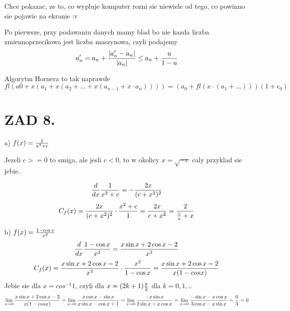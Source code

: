 \documentclass{article}[13pt]
\begin{document}
    Chce pokazac, ze to, co wypluje komputer rozni sie niewiele od tego, co powinno sie pojawic na ekranie :v
    \medskip

    Po pierwsze, przy podawaniu danych mamy blad bo nie kazda liczba zmiennoprzecikowa jest liczba maszynowa, czyli podajemy
    $$a_n'=a_n+{|a_n'-a_n|\over |a_n|}\leq a_n+{u\over 1-u}$$

    Algorytm Hornera to tak naprawde
    $$fl(a0+x(a_1+x(a_2+...+x(a_{n-1}+x\cdot a_n))))=(a_0+fl(x\cdot(a_1+...)))(1+\epsilon_0)$$

    \section*{ZAD 8.}
    a) $f(x)={1\over x^2+c}$

    Jezeli $c>=0$ to smiga, ale jesli $c<0$, to w okolicy $x=\sqrt{-c}$ caly przyklad sie jebie.

    $${d\over dx}{1\over x^2+c}=-{2x\over (c+x^2)^2}$$
    $$C_f(x)={2x\over (c+x^2)^2}\cdot{x^2+c\over 1}={2x\over c+x^2}={2\over \frac{c}{x}+x}$$
    \medskip

    b) $f(x)={1-\cos x\over x^2}$
    $${d\over dx}{1-\cos x\over x^2}={x\sin x+2\cos x-2\over x^3}$$
    $$C_f(x)={x\sin x+2\cos x-2\over x^3}\cdot {x^2\over 1-\cos x}={x\sin x+2\cos x-2\over x(1-cos x)}$$
    Jebie sie dla $x = cos^{-1}1$, czyli dla $x=(2k+1){\pi\over 2}$ dla $k=0,1, ..$
    $$\lim\limits_{x\to 0}{x\sin x+2\cos x-2\over x(1-cos x)}=\lim\limits_{x\to 0}{x\cos x-\sin x\over x\sin x-\cos x+1}=\lim\limits_{x\to 0}{-x\sin x\over 2\sin x+x\cos x}=\lim\limits_{x\to 0}{-\sin x-x\cos x \over 3\cos x-x\sin x}=\frac03=0$$
\end{document}
